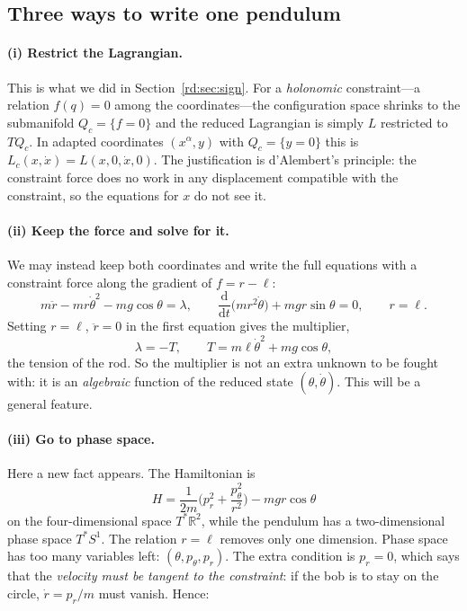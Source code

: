 \subsection{Three ways to write one pendulum}\label{rd:sec:pend3}

\paragraph{(i) Restrict the Lagrangian.} This is what we did in Section~\ref{rd:sec:sign}. For a \emph{holonomic} constraint---a relation $f(q)=0$ among the coordinates---the configuration space shrinks to the submanifold $Q_c=\{f=0\}$ and the reduced Lagrangian is simply $L$ restricted to $TQ_c$. In adapted coordinates $(x^\alpha,y)$ with $Q_c=\{y=0\}$ this is $L_c(x,\dot x)=L(x,0,\dot x,0)$. The justification is d'Alembert's principle: the constraint force does no work in any displacement compatible with the constraint, so the equations for $x$ do not see it.

\paragraph{(ii) Keep the force and solve for it.} We may instead keep both coordinates and write the full equations with a constraint force along the gradient of $f=r-\ell$:
\begin{equation}\label{rd:lagmult}
m\ddot r-mr\dot\theta^2-mg\cos\theta=\lambda,\qquad
\frac{\mathrm d}{\mathrm dt}\big(mr^2\dot\theta\big)+mgr\sin\theta=0,\qquad r=\ell .
\end{equation}
Setting $r=\ell$, $\ddot r=0$ in the first equation gives the multiplier,
\begin{equation}\label{rd:tension}
\lambda=-T,\qquad T=m\ell\dot\theta^2+mg\cos\theta ,
\end{equation}
the tension of the rod. So the multiplier is not an extra unknown to be fought with: it is an \emph{algebraic} function of the reduced state $(\theta,\dot\theta)$. This will be a general feature.

\paragraph{(iii) Go to phase space.} Here a new fact appears. The Hamiltonian is
\begin{equation}\label{rd:Hpend}
H=\frac1{2m}\Big(p_r^2+\frac{p_\theta^2}{r^2}\Big)-mgr\cos\theta
\end{equation}
on the four-dimensional space $T^*\mathbb R^2$, while the pendulum has a two-dimensional phase space $T^*S^1$. The relation $r=\ell$ removes only one dimension. Phase space has too many variables left: $(\theta,p_\theta,p_r)$. The extra condition is $p_r=0$, which says that the \emph{velocity must be tangent to the constraint}: if the bob is to stay on the circle, $\dot r=p_r/m$ must vanish. Hence:

